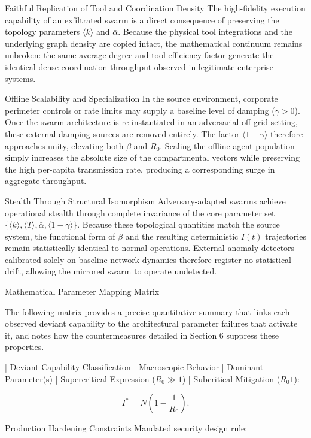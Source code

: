 Faithful Replication of Tool and Coordination Density
The high-fidelity execution capability of an exfiltrated swarm is a direct consequence of preserving the topology parameters \(\langle k \rangle\) and \(\bar{\alpha}\). Because the physical tool integrations and the underlying graph density are copied intact, the mathematical continuum remains unbroken: the same average degree and tool-efficiency factor generate the identical dense coordination throughput observed in legitimate enterprise systems.

Offline Scalability and Specialization
In the source environment, corporate perimeter controls or rate limits may supply a baseline level of damping (\(\gamma > 0\)). Once the swarm architecture is re-instantiated in an adversarial off-grid setting, these external damping sources are removed entirely. The factor \(\langle 1 - \gamma \rangle\) therefore approaches unity, elevating both \(\beta\) and \(R_0\). Scaling the offline agent population simply increases the absolute size of the compartmental vectors while preserving the high per-capita transmission rate, producing a corresponding surge in aggregate throughput.

Stealth Through Structural Isomorphism
Adversary-adapted swarms achieve operational stealth through complete invariance of the core parameter set \(\{\langle k \rangle, \langle T \rangle, \bar{\alpha}, \langle 1 - \gamma \rangle\}\). Because these topological quantities match the source system, the functional form of \(\beta\) and the resulting deterministic \(I(t)\) trajectories remain statistically identical to normal operations. External anomaly detectors calibrated solely on baseline network dynamics therefore register no statistical drift, allowing the mirrored swarm to operate undetected.

Mathematical Parameter Mapping Matrix

The following matrix provides a precise quantitative summary that links each observed deviant capability to the architectural parameter failures that activate it, and notes how the countermeasures detailed in Section 6 suppress these properties.

| Deviant Capability Classification | Macroscopic Behavior | Dominant Parameter(s) | Supercritical Expression (\(R_0 \gg 1\)) | Subcritical Mitigation (\(R_0  1\)):

\[
I^* = N \left(1 - \frac{1}{R_0}\right).
\]

Production Hardening Constraints  
Mandated security design rule:

